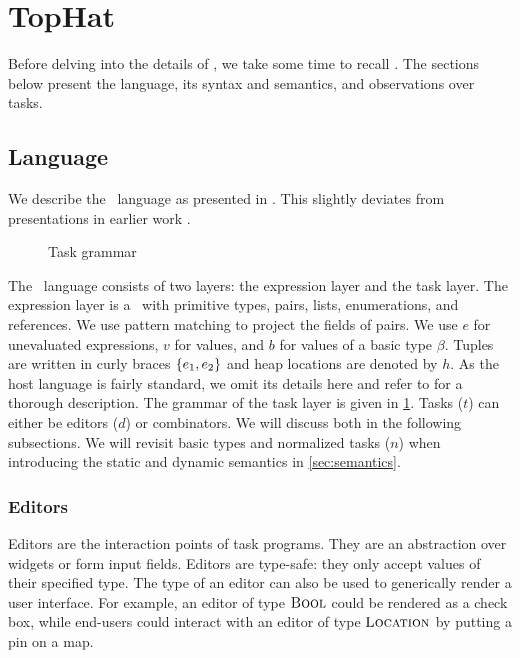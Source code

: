 
\section{TopHat}
\label{sec:tophat}

Before delving into the details of \DYNTOPHAT, we take some time to recall \TOPHAT.
The sections below present the language, its syntax and semantics, and observations over tasks.

\subsection{Language}

We describe the \TOPHAT\ language as presented in \citet{Steenvoorden22}.
This slightly deviates from presentations in earlier work \cite{conf/ppdp/SteenvoordenNK19,conf/ifl/NausSK19,conf/sfp/NausS20}.

\begin{figure}[b]
  \GTaskscompact
  \caption{Task grammar}
  \label{fig:task-grammar}
\end{figure}

The \TOPHAT\ language consists of two layers: the expression layer and the task layer.
The expression layer is a \STLC\ with primitive types, pairs, lists, enumerations, and references.
We use pattern matching to project the fields of pairs.
We use $e$ for unevaluated expressions, $v$ for values, and $b$ for values of a basic type $\beta$.
Tuples are written in curly braces $\{e_1, e_2\}$ and heap locations are denoted by $h$.
As the host language is fairly standard, we omit its details here
and refer to \citet{Steenvoorden22} for a thorough description.
The grammar of the task layer is given in \cref{fig:task-grammar}.
Tasks ($t$) can either be editors ($d$) or combinators.
We will discuss both in the following subsections.
We will revisit basic types and normalized tasks ($n$) when introducing the static and dynamic semantics in \cref{sec:semantics}.

\subsubsection{Editors}

Editors are the interaction points of task programs.
They are an abstraction over widgets or form input fields.
Editors are type-safe:
they only accept values of their specified type.
The type of an editor can also be used to generically render a user interface.
For example,
an editor of type ${\text{\normalfont\sffamily\scshape Bool}}$ could be rendered as a check box,
while end-users could interact with an editor of type $\textsc{Location}$ by putting a pin on a map.


